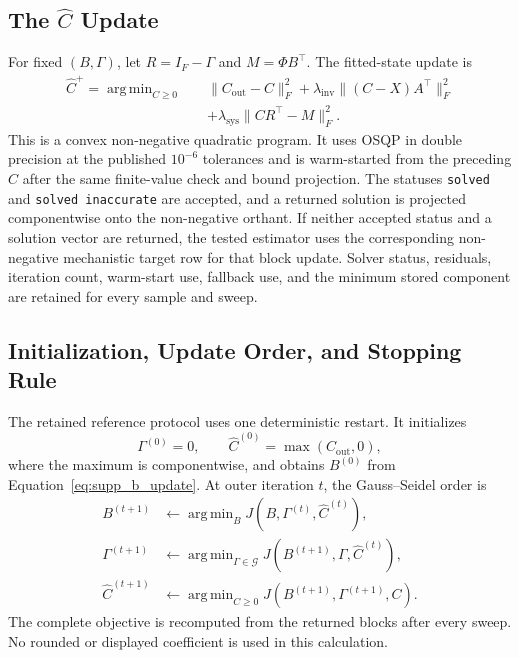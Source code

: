 \documentclass[a4paper,fleqn]{cas-sc}
\DeclareMathOperator*{\argminop}{arg\,min}
\begin{document}
\subsection{The $\widehat C$ Update}

For fixed $(B,\Gamma)$, let $R=I_F-\Gamma$ and $M=\Phi B^\top$. The fitted-state update is
\begin{equation}
\label{eq:supp_chat_update}
\begin{aligned}
\widehat C^+=\argminop_{C\geq0}\quad
&\|C_{\mathrm{out}}-C\|_F^2
+\lambda_{\mathrm{inv}}\|(C-X)A^\top\|_F^2\\
&+\lambda_{\mathrm{sys}}\|CR^\top-M\|_F^2.
\end{aligned}
\end{equation}
This is a convex non-negative quadratic program. It uses OSQP in double precision at the published $10^{-6}$ tolerances and is warm-started from the preceding $\widehat C$ after the same finite-value check and bound projection. The statuses \texttt{solved} and \texttt{solved inaccurate} are accepted, and a returned solution is projected componentwise onto the non-negative orthant. If neither accepted status and a solution vector are returned, the tested estimator uses the corresponding non-negative mechanistic target row for that block update. Solver status, residuals, iteration count, warm-start use, fallback use, and the minimum stored component are retained for every sample and sweep.

\subsection{Initialization, Update Order, and Stopping Rule}

The retained reference protocol uses one deterministic restart. It initializes
\begin{equation}
\Gamma^{(0)}=0,\qquad
\widehat C^{(0)}=\max(C_{\mathrm{out}},0),
\end{equation}
where the maximum is componentwise, and obtains $B^{(0)}$ from Equation~\eqref{eq:supp_b_update}. At outer iteration $t$, the Gauss--Seidel order is
\begin{align}
B^{(t+1)}&\leftarrow\argminop_B
J(B,\Gamma^{(t)},\widehat C^{(t)}),\nonumber\\
\Gamma^{(t+1)}&\leftarrow\argminop_{\Gamma\in\mathcal G}
J(B^{(t+1)},\Gamma,\widehat C^{(t)}),\nonumber\\
\widehat C^{(t+1)}&\leftarrow\argminop_{C\geq0}
J(B^{(t+1)},\Gamma^{(t+1)},C).
\label{eq:supp_update_order}
\end{align}
The complete objective is recomputed from the returned blocks after every sweep. No rounded or displayed coefficient is used in this calculation.
\end{document}
